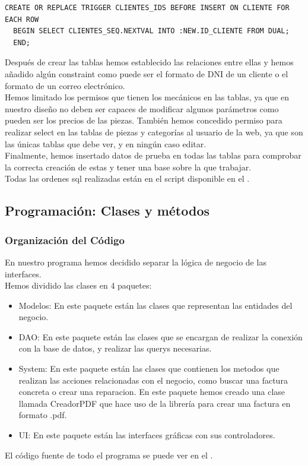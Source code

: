 \documentclass{article}
\begin{document}
{\begin{lstlisting}[caption=Código sql para autogenerar IDs]
  CREATE OR REPLACE TRIGGER CLIENTES_IDS BEFORE INSERT ON CLIENTE FOR EACH ROW
  BEGIN SELECT CLIENTES_SEQ.NEXTVAL INTO :NEW.ID_CLIENTE FROM DUAL;
  END;
\end{lstlisting}
Después de crear las tablas hemos establecido las relaciones entre ellas y hemos añadido algún constraint como puede ser el formato de DNI de un cliente o el formato de un correo electrónico.\\ 
Hemos limitado los permisos que tienen los mecánicos en las tablas, ya que en nuestro diseño no deben ser capaces de modificar algunos parámetros como pueden ser los precios de las piezas. También hemos concedido permiso para
realizar select en las tablas de piezas y categorías al usuario de la web, ya que son las únicas tablas que debe ver, y en ningún caso editar.\\ 
Finalmente, hemos insertado datos de prueba en todas las tablas para comprobar la correcta creación de estas y tener una base sobre la que trabajar.\\ 
Todas las ordenes sql realizadas están en el script disponible en el \href{https://github.com/DreaMan92/TrabajoTaller/blob/main/BBDD/Oracle/Script.sql}{\color{red}{repositorio de github}}.
}

\subsection{Programación: Clases y métodos}
  \subsubsection{Organización del Código}
  En nuestro programa hemos decidido separar la lógica de negocio de las interfaces.\\ 
  Hemos dividido las clases en 4 paquetes:\\
  \begin{itemize}
    \item Modelos: En este paquete están las clases que representan las entidades del negocio. 
    \item DAO: En este paquete están las clases que se encargan de realizar la conexión con la base de datos, y realizar las querys necesarias.
    \item System: En este paquete están las clases que contienen los metodos que realizan las acciones relacionadas con el negocio, como buscar una factura concreta o crear una reparacion. En este paquete hemos creado una clase llamada CreadorPDF 
    que hace uso de la librería \href{https://github.com/itext}{\color{red}{iText}} para crear una factura en formato .pdf.
    \item UI: En este paquete están las interfaces gráficas con sus controladores. 
  \end{itemize}
  El código fuente de todo el programa se puede ver en el \href{https://github.com/martinfgar/TallerProgramacion}{\color{red}{repositorio de github del proyecto}}.
\end{document}
